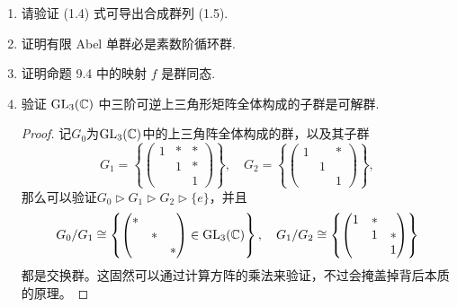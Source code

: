 \begin{enumerate}
\item 请验证 (1.4) 式可导出合成群列 (1.5).
\item 证明有限 Abel 单群必是素数阶循环群.
\item 证明命题 9.4 中的映射 $f$ 是群同态.
\item 验证 ${\rm GL}_{3}(\mathbb{C})$ 中三阶可逆上三角形矩阵全体构成的子群是可解群.
\begin{proof}
    记$G_0$为${\rm GL}_3(\mathbb{C})$中的上三角阵全体构成的群，以及其子群
    \[G_1=\left\{\begin{pmatrix}1&*&*\\ &1&*\\ & &1\end{pmatrix}\right\},
    \quad G_2=\left\{\begin{pmatrix}1& &*\\ &1& \\ & &1\end{pmatrix}\right\},\]
    那么可以验证$G_0 \triangleright G_1 \triangleright G_2 \triangleright \{e\}$，并且
    \[G_0/G_1\cong\left\{\begin{pmatrix}*& & \\ &*& \\ & &*\end{pmatrix}\in{\rm GL}_3(\mathbb{C})\right\}, \quad G_1/G_2\cong\left\{\begin{pmatrix}1&*& \\ &1&*\\ & &1\end{pmatrix}\right\}\]
    都是交换群。这固然可以通过计算方阵的乘法来验证，不过会掩盖掉背后本质的原理。
    

\end{proof}
\end{enumerate}
